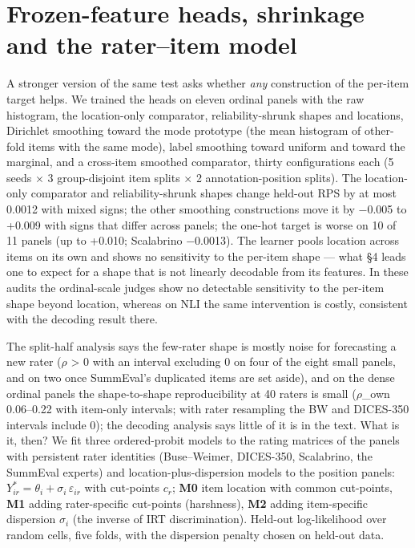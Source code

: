 \documentclass[10pt,twocolumn]{article}
\begin{document}
\section{Frozen-feature heads, shrinkage and the rater--item model}


A stronger version of the same test asks whether \emph{any} construction of the per-item target helps. We trained the heads on eleven ordinal panels with the raw histogram, the location-only comparator, reliability-shrunk shapes and locations, Dirichlet smoothing toward the mode prototype (the mean histogram of other-fold items with the same mode), label smoothing toward uniform and toward the marginal, and a cross-item smoothed comparator, thirty configurations each (5 seeds $\times$ 3 group-disjoint item splits $\times$ 2 annotation-position splits). The location-only comparator and reliability-shrunk shapes change held-out RPS by at most 0.0012 with mixed signs; the other smoothing constructions move it by $-$0.005 to +0.009 with signs that differ across panels; the one-hot target is worse on 10 of 11 panels (up to +0.010; Scalabrino $-$0.0013). The learner pools location across items on its own and shows no sensitivity to the per-item shape --- what \S{}4 leads one to expect for a shape that is not linearly decodable from its features. In these audits the ordinal-scale judges show no detectable sensitivity to the per-item shape beyond location, whereas on NLI the same intervention is costly, consistent with the decoding result there.

The split-half analysis says the few-rater shape is mostly noise for forecasting a new rater ($\rho$ \textgreater{} 0 with an interval excluding 0 on four of the eight small panels, and on two once SummEval's duplicated items are set aside), and on the dense ordinal panels the shape-to-shape reproducibility at 40 raters is small ($\rho$\_own 0.06--0.22 with item-only intervals; with rater resampling the BW and DICES-350 intervals include 0); the decoding analysis says little of it is in the text. What is it, then? We fit three ordered-probit models to the rating matrices of the panels with persistent rater identities (Buse--Weimer, DICES-350, Scalabrino, the SummEval experts) and location-plus-dispersion models to the position panels: \(Y^*_{ir} = \theta_i + \sigma_i\,\varepsilon_{ir}\) with cut-points \(c_{r}\); \textbf{M0} item location with common cut-points, \textbf{M1} adding rater-specific cut-points (harshness), \textbf{M2} adding item-specific dispersion \(\sigma_i\) (the inverse of IRT discrimination). Held-out log-likelihood over random cells, five folds, with the dispersion penalty chosen on held-out data.
\end{document}

